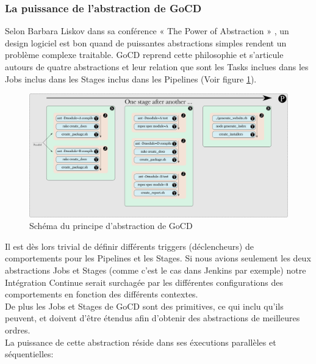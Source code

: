     \subsubsection{La puissance de l'abstraction de GoCD}
    Selon Barbara Liskov dans sa conférence « The Power of Abstraction » \cite{Lis09}, un design logiciel est bon quand de puissantes abstractions simples rendent un problème complexe traitable. GoCD reprend cette philosophie et s'articule autours de quatre abstractions et leur relation que sont les Tasks inclues dans les Jobs inclus dans les Stages inclus dans les Pipelines (Voir figure \ref{Pipeline}).\\

    \begin{figure}
      \begin{center}
        \includegraphics[scale=0.7]{images/pipeline.png}
      \end{center}
      \caption{Schéma du principe d'abstraction de GoCD}
      \label{Pipeline}
    \end{figure}

    Il est dès lors trivial de définir différents \gls{trigger}s (déclencheurs) de comportements pour les Pipelines et les Stages. Si nous avions seulement les deux abstractions Jobs et Stages (comme c'est le cas dans Jenkins par exemple) notre Intégration Continue serait surchagée par les différentes configurations des comportements en fonction des différents contextes.\\

    De plus les Jobs et Stages de GoCD sont des primitives, ce qui inclu qu'ils peuvent, et doivent d'être étendus afin d'obtenir des abstractions de meilleures ordres.\\

    La puissance de cette abstraction réside dans ses éxecutions parallèles et séquentielles:\\


